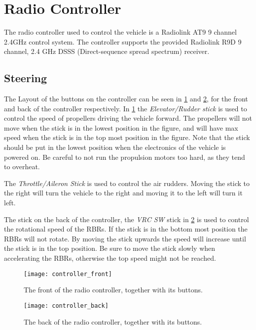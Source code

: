 \section{Radio Controller}
The radio controller used to control the vehicle is a Radiolink AT9 9 channel
2.4GHz control system. The controller supports the provided Radiolink R9D
9 channel, 2.4 GHz DSSS (Direct-sequence spread spectrum) receiver.

\subsection{Steering}
The Layout of the buttons on the controller can be seen in
\cref{fig:controller_front} and \cref{fig:controller_back}, for the front and
back of the controller respectively. In \cref{fig:controller_front} the
\textit{Elevator/Rudder stick} is used to control the speed of propellers
driving the vehicle forward. The propellers will not move when the stick is in the
lowest position in the figure, and will have max speed when the stick is in the
top most position in the figure. Note that the stick should be put in the
lowest position when the electronics of the vehicle is powered on. Be careful to not run the propulsion motors too hard, as they tend to overheat.

The \textit{Throttle/Aileron Stick} is used to control the air rudders. Moving
the stick to the right will turn the vehicle to the right and moving it to the
left will turn it left.

The stick on the back of the controller, the \textit{VRC SW} stick in
\cref{fig:controller_back} is used to control the rotational speed of the RBRs.
If the stick is in the bottom most position the RBRs will not rotate. By moving
the stick upwards the speed will increase until the stick is in the top
position. Be sure to move the stick slowly when accelerating the RBRs, otherwise the top speed might not be reached.

\begin{figure}[h]
   \centering
   \texttt{[image: controller\_front]}
   \caption{The front of the radio controller, together with its buttons.}
   \label{fig:controller_front}
\end{figure}

\begin{figure}[h]
   \centering
   \texttt{[image: controller\_back]}
   \caption{The back of the radio controller, together with its buttons.}
   \label{fig:controller_back}
\end{figure}

